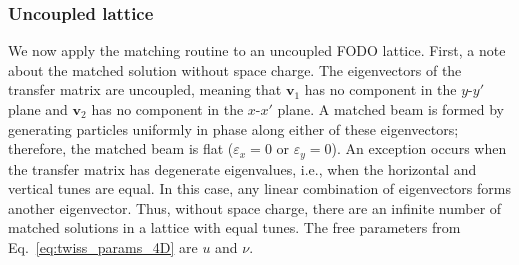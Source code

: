 \subsubsection{Uncoupled lattice}

We now apply the matching routine to an uncoupled FODO lattice. First, a note about the matched solution without space charge. The eigenvectors of the transfer matrix are uncoupled, meaning that $\mathbf{v}_1$ has no component in the $y$-$y'$ plane and $\mathbf{v}_2$ has no component in the $x$-$x'$ plane. A matched beam is formed by generating particles uniformly in phase along either of these eigenvectors; therefore, the matched beam is flat ($\varepsilon_x = 0$ or $\varepsilon_y = 0$). An exception occurs when the transfer matrix has degenerate eigenvalues, i.e., when the horizontal and vertical tunes are equal. In this case, any linear combination of eigenvectors forms another eigenvector. Thus, without space charge, there are an infinite number of matched solutions in a lattice with equal tunes. The free parameters from Eq.~\eqref{eq:twiss_params_4D} are $u$ and $\nu$.

